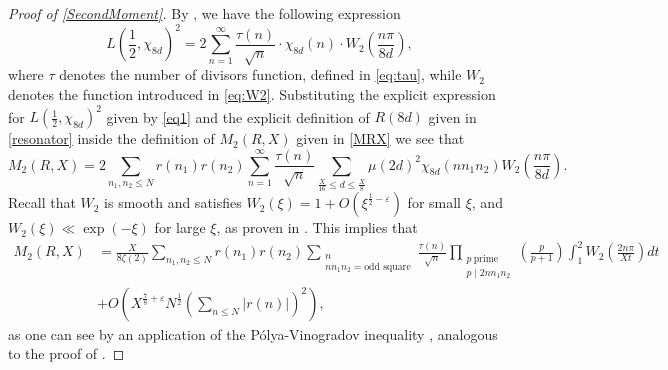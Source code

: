 \documentclass[10pt,a4paper]{amsart}
\theoremstyle{plain}
\theoremstyle{definition}
\theoremstyle{remark}
\begin{document}
\begin{proof}[Proof of \cref{SecondMoment}]
By \cite[Lemma 2.2]{Soundararajan_2000}, we have the following expression
\begin{equation}\label{eq1}
L\left(\frac{1}{2},\chi_{8d}\right)^2=2\sum_{n=1}^{\infty}\frac{\tau(n)}{\sqrt{n}} \cdot \chi_{8d}(n) \cdot W_2\left(\frac{n \pi}{8 d}\right),
\end{equation}
where $\tau$ denotes the number of divisors function, defined in \eqref{eq:tau}, while $W_2$ denotes the function introduced in \eqref{eq:W2}.
Substituting the explicit expression for $L\left(\frac{1}{2},\chi_{8d}\right)^2$ given by \eqref{eq1} and the explicit definition of $R(8d)$ given in \eqref{resonator} inside the definition of $M_2(R,X)$ given in \eqref{MRX} we see that
\[
M_2(R,X)=2\sum_{n_1,n_2\leq N}r(n_1)r(n_2)\sum_{n=1}^{\infty}\frac{\tau(n)}{\sqrt{n}}\sum_{\frac{X}{16}\leq d\leq \frac{X}{8}}\mu(2d)^2\chi_{8d}(nn_1n_2)W_2\left(\frac{n\pi}{8d}\right).
\]
Recall that $W_2$ is smooth and satisfies $W_2(\xi) = 1 + O(\xi^{\frac{1}{2}-\varepsilon})$ for small $\xi$, and $W_2(\xi) \ll \exp(-\xi)$ for large $\xi$, as proven in \cite[Lemma 2.1]{Soundararajan_2000}.
This implies that
\begin{equation}\label{equ2}
\begin{aligned}
M_2(R,X)&=\frac{X}{8\zeta(2)}\sum_{n_1,n_2\leq N}r(n_1)r(n_2)\sum_{\substack{n\\nn_1n_2=\text{odd square}}}\frac{\tau(n)}{\sqrt{n}}\prod_{\substack{p \ \text{prime} \\ p\mid 2nn_1n_2}}\left(\frac{p}{p+1}\right)\int_1^2 W_2\left(\frac{2n\pi}{Xt}\right)dt \\ &+ O\left(X^{\frac{7}{8}+\varepsilon}N^{\frac{1}{2}} \left(\sum_{n\leq N}|r(n)|\right)^2\right),
\end{aligned}
\end{equation}
as one can see by an application of the Pólya-Vinogradov inequality \cite[Theorem~12.5]{Iwaniec_Kowalski_2004}, analogous to the proof of \cite[Lemma 3.2]{Soundararajan_2008}.


\end{proof}
\end{document}
